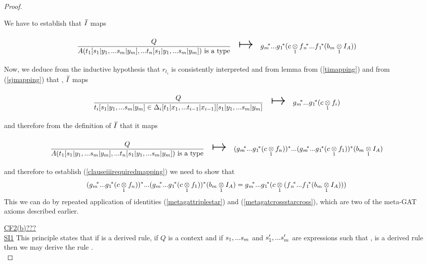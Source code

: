 \begin{proof}
\begin{newtt}
We have to establish that $\Ibar$ maps
\begin{equation}
\label{clauseiiirequiredmapping}
\begin{array}{c c c}
\forceSOURCEwidth & & \forceTARGETwidth \\ [-0.1cm]
\gatdisplayrule{Q}{\isT{A(t_1[\SUBsmFORym],...t_n[\SUBsmFORym])}}   & \Imapsto & \gmvectorstar (\crossx{c}{\fnvectorstar(\crossx{b_m}{I_A}{1})}{1}) \\ [0.4cm]
\end{array}
\end{equation}
Now, we deduce from  the inductive hypothesis that $r_{t_i}$ is consistently interpreted and 
from lemma  from (\ref{timapping}) and from (\ref{sjmapping}) that \foreachi, $\Ibar$ maps
\begin{equation}
\begin{array}{c c c}
\forceSOURCEwidth & & \forceTARGETwidth \\ [-0.1cm]
\gatdisplayrule{Q}{\ofT{t_i[\SUBsmFORym]}{\Delta_i[t_1 | x_1,...t_{i-1}|x_{i-1}][\SUBsmFORym]}}  & \Imapsto & \gmvectorstar (\crossx{c}{f_i}{1}) \\ [0.4cm]
\end{array}
\end{equation}
and therefore from the definition of $\Ibar$ that it maps
\begin{equation*}
\begin{array}{c c c}
\forceSOURCEwidth & & \forceTARGETwidth \\ [-0.1cm]
\gatdisplayrule{Q}{\isT{A(t_1[\SUBsmFORym],...t_n[\SUBsmFORym])}}  & \Imapsto & \clausethreelhs \\ [0.4cm]
\end{array}
\end{equation*}
and therefore to establish (\ref{clauseiiirequiredmapping}) we need to show that
\begin{equation*}
(g{_m}\kern-.25em^*...g{_1}\kern-.15em^* (c \underset{1}{\otimes} f_n))^* ... (g{_m}\kern-.25em^*...g{_1}\kern-.15em^* (c \underset{1}{\otimes} f_1)) ^* (b_m \underset{1}{\otimes} I_A) = g{_m}\kern-.25em^*...g{_1}\kern-.15em^* ( c \underset{1}{\otimes} (f{_n}\kern-.2em^*...f{_1}\kern-.15em^*(b_m \underset{1}{\otimes} I_A)) )										
\end{equation*}
This we can do by repeated application of identities (\ref{metagattriplestar})
and (\ref{metagatcrossstarcross}), which are two of the meta-GAT axioms described earlier.\\
\end{newtt}

\underline{CF2(b)???} \\

\underline{SI1} 
This principle states that if  is a derived rule, if $Q$ is a context and if  $s_1,...s_m$ and $s'_1,...s'_m$ are expressions such that
\foreachj,  is a derived rule then we may derive the rule
. \\


\end{proof}
